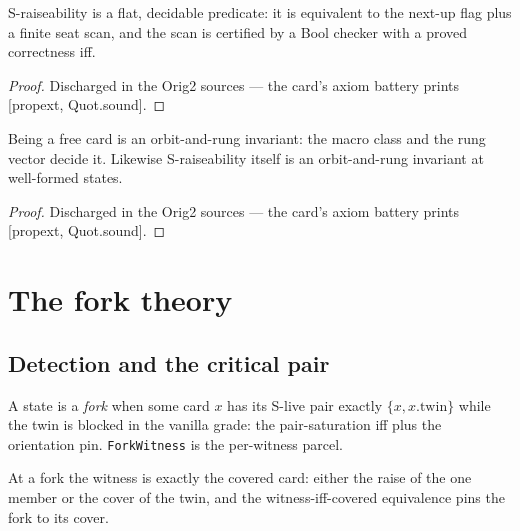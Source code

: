 \begin{theorem}\label{thm:decidable}
\leanok
{}
S-raiseability is a flat, decidable predicate: it is equivalent
to the next-up flag plus a finite seat scan, and the scan is
certified by a Bool checker with a proved correctness iff.
\end{theorem}

\begin{proof}
\leanok
Discharged in the Orig2 sources --- the card's axiom battery prints [propext, Quot.sound].
\end{proof}

\begin{theorem}\label{thm:freeorbit}
\leanok
{}
Being a free card is an orbit-and-rung invariant: the macro class
and the rung vector decide it.  Likewise S-raiseability itself is
an orbit-and-rung invariant at well-formed states.
\end{theorem}

\begin{proof}
\leanok
Discharged in the Orig2 sources --- the card's axiom battery prints [propext, Quot.sound].
\end{proof}

\chapter{The fork theory}
\label{chap:fork}

\section{Detection and the critical pair}

\begin{definition}\label{def:fork}
\leanok
{}
A state is a \emph{fork} when some card $x$ has its S-live pair
exactly $\{x, x.\mathrm{twin}\}$ while the twin is blocked in the
vanilla grade: the pair-saturation iff plus the orientation pin.
\texttt{ForkWitness} is the per-witness parcel.
\end{definition}

\begin{theorem}\label{thm:criticalPair}
\leanok
{}
At a fork the witness is exactly the covered card: either the
raise of the one member or the cover of the twin, and the
witness-iff-covered equivalence pins the fork to its cover.
\end{theorem}

